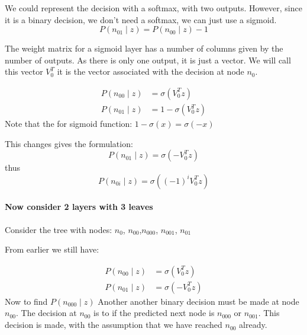 \documentclass[parskip]{komatufte}
\begin{document}
We could represent the decision with a softmax, with two outputs.
However, since it is a binary decision, we don't need a softmax, we
can just use a sigmoid.
\begin{equation}
P(n_{01}\mid z)=P(n_{00}\mid z)-1
\end{equation}

The weight matrix for a sigmoid layer has a number of columns given
by the number of outputs.
As there is only one output, it is just a vector.
We will call this vector $V_{0}^{T}$ it is the vector associated with the decision at node $n_{0}$.


\begin{align}
P(n_{00}\mid z) &=\sigma(V_{0}^{T}z) \\
P(n_{01}\mid z) &=1-\sigma(V_{0}^{T}z)
\end{align}
Note that the for sigmoid function: $1-\sigma(x)=\sigma(-x)$

This changes gives the formulation:
\begin{equation}
P(n_{01}\mid z)=\sigma({-}V_{0}^{T}z)
\end{equation}
thus
\begin{equation}
P(n_{0i}\mid z)=\sigma(({-}1)^i V_{0}^{T}z)
\end{equation}


\paragraph{Now consider 2 layers with 3 leaves}

Consider the tree with nodes: $n_{0}$, $n_{00}$,$n_{000}$, $n_{001}$, $n_{01}$


From earlier we still have:

\begin{align}
P(n_{00}\mid z)&=\sigma(V_{0}^{T}z)\\
P(n_{01}\mid z)&=\sigma(-V_{0}^{T}z)
\end{align}
Now to find $P(n_{000}\mid z)$
Another another binary decision must be made at node $n_{00}$.
The decision at $n_{00}$ is to if the predicted next node is $n_{000}$ or $n_{001}$.
This decision is made, with the assumption that we have reached $n_{00}$ already.
\end{document}
